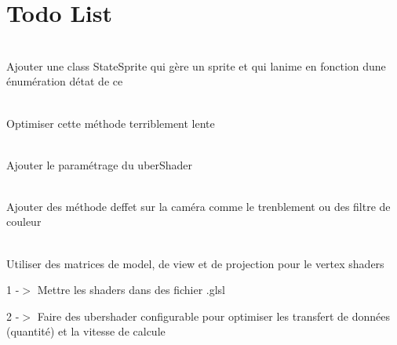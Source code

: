 \chapter{Todo List}
\hypertarget{todo}{}\label{todo}

\begin{DoxyRefList}
\item[Class \doxylink{classAnimatedSprite}{Animated\+Sprite} ]\hfill \\
\label{todo__todo000001}%
%
Ajouter une class State\+Sprite qui gère un sprite et qui l\textquotesingle{}anime en fonction d\textquotesingle{}une énumération d\textquotesingle{}état de ce   
\item[Member \doxylink{bbopFunc_8cpp_adb58533b6c571ff05497756cc224b28a}{bbop\+Debug\+Collision\+Box} (const \doxylink{classCollisionBox}{Collision\+Box} \&box, \doxylink{classScene}{Scene} \&scene)]\hfill \\
\label{todo__todo000003}%
%
Optimiser cette méthode terriblement lente  
\item[Member \doxylink{bbopFunc_8cpp_a697650ee78695079a1f5549465584e43}{bbop\+Init} (int windowX, int windowY, const char \texorpdfstring{$\ast$}{*}window\+Name, GLFWwindow \texorpdfstring{$\ast$}{*}\&window)]\hfill \\
\label{todo__todo000002}%
%
Ajouter le paramétrage du uber\+Shader  
\item[Class \doxylink{classCamera}{Camera} ]\hfill \\
\label{todo__todo000005}%
%
Ajouter des méthode d\textquotesingle{}effet sur la caméra comme le trenblement ou des filtre de couleur  
\item[Member \doxylink{shaders_8cpp_aa4e3821fb3d25cef0fcd8bd89a1666e8}{default\+Fragment} ]\hfill \\
\label{todo__todo000010}%
%
Utiliser des matrices de model, de view et de projection pour le vertex shaders

\label{todo__todo000011}%
%
1 -\/\texorpdfstring{$>$}{>} Mettre les shaders dans des fichier .glsl 



2 -\/\texorpdfstring{$>$}{>} Faire des ubershader configurable pour optimiser les transfert de données (quantité) et la vitesse de calcule 




\end{DoxyRefList}
